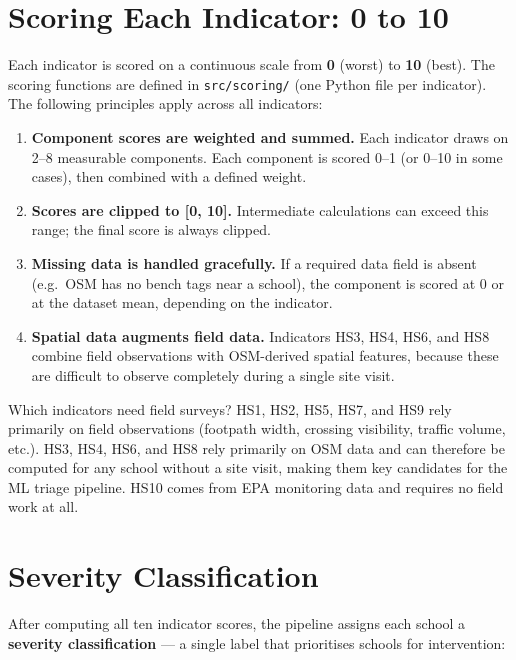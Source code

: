 \documentclass[11pt,a4paper,openany]{book}
\begin{document}
\section{Scoring Each Indicator: 0 to 10}

Each indicator is scored on a continuous scale from \textbf{0} (worst) to \textbf{10} (best). The scoring functions are defined in \texttt{src/scoring/} (one Python file per indicator). The following principles apply across all indicators:

\begin{enumerate}
  \item \textbf{Component scores are weighted and summed.} Each indicator draws on 2--8 measurable components. Each component is scored 0--1 (or 0--10 in some cases), then combined with a defined weight.
  \item \textbf{Scores are clipped to [0, 10].} Intermediate calculations can exceed this range; the final score is always clipped.
  \item \textbf{Missing data is handled gracefully.} If a required data field is absent (e.g.\ OSM has no bench tags near a school), the component is scored at 0 or at the dataset mean, depending on the indicator.
  \item \textbf{Spatial data augments field data.} Indicators HS3, HS4, HS6, and HS8 combine field observations with OSM-derived spatial features, because these are difficult to observe completely during a single site visit.
\end{enumerate}

\begin{tipbox}{Which indicators need field surveys?}
HS1, HS2, HS5, HS7, and HS9 rely primarily on field observations (footpath width, crossing visibility, traffic volume, etc.). HS3, HS4, HS6, and HS8 rely primarily on OSM data and can therefore be computed for any school without a site visit, making them key candidates for the ML triage pipeline. HS10 comes from EPA monitoring data and requires no field work at all.
\end{tipbox}

\section{Severity Classification}

After computing all ten indicator scores, the pipeline assigns each school a \textbf{severity classification} --- a single label that prioritises schools for intervention:
\end{document}
